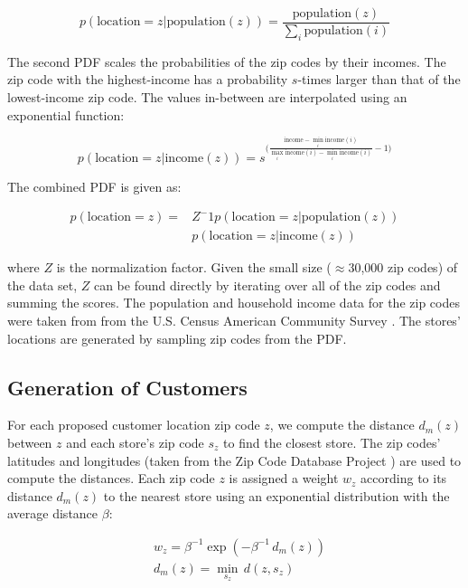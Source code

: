 \documentclass[conference]{IEEEtran}
\begin{document}
\begin{equation*}
p(\text{location}=z | \text{population}(z)) = \frac{\text{population}(z)}{\sum_{i} \text{population}(i)}
\end{equation*}

The second PDF scales the probabilities of the zip codes by their incomes.  The zip code with the highest-income has a probability $s$-times larger than that of the lowest-income zip code. The values in-between are interpolated using an exponential function:

\begin{equation*}
p(\text{location}=z | \text{income}(z)) = s ^ {\big( \frac{\text{income} - \min_i{\textrm{income}(i)}} {\max_i{\textrm{income}(i)} - \min_i{\textrm{income}(i)}} - 1 \big)}
\end{equation*}

The combined PDF is given as: 

\begin{align*}
p(\text{location}=z) = &Z^-1 p(\text{location}=z | \text{population}(z)) \\
&p(\text{location}=z | \text{income}(z))
\end{align*}

where $Z$ is the normalization factor.  Given the small size ($\approx$30,000 zip codes) of the data set, $Z$ can be found directly by iterating over all of the zip codes and summing the scores. The population and household income data for the zip codes were taken from from the U.S. Census American Community Survey \cite{ACS}.  The stores' locations are generated by sampling zip codes from the PDF.

\subsection{Generation of Customers}
For each proposed customer location zip code $z$, we compute the distance $d_m(z)$ between $z$ and each store's zip code $s_z$ to find the closest store.  The zip codes' latitudes and longitudes (taken from the Zip Code Database Project \cite{Zips}) are used to compute the distances. Each zip code $z$ is assigned a weight $w_z$ according to its distance $d_m(z)$ to the nearest store using an exponential distribution with the average distance $\beta$:

\begin{align*}
&w_z = \beta^{-1} \exp(-\beta^{-1} \, d_m(z)) \\
&d_m(z) = \min_{s_z} \, d(z, s_z)
\end{align*}
\end{document}
